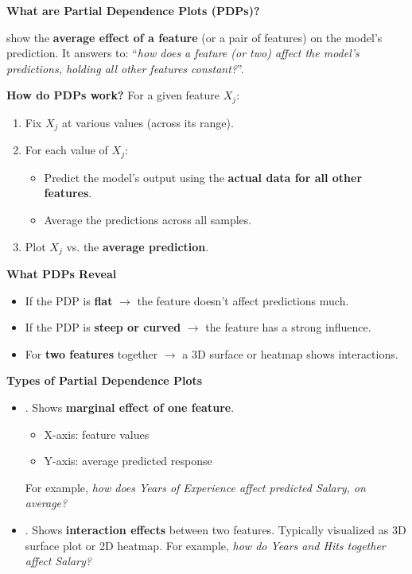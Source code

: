\newpage

\begin{flushleft}
    \textcolor{Green3}{ \textbf{What are Partial Dependence Plots (PDPs)?}}
\end{flushleft}
 show the \textbf{average effect of a feature} (or a pair of features) on the model's prediction. It answers to: ``\emph{how does a feature (or two) affect the model's predictions, holding all other features constant?}''.

\highspace
\textcolor{Green3}{ \textbf{How do PDPs work?}} For a given feature $X_j$:
\begin{enumerate}
    \item Fix $X_j$ at various values (across its range).
    \item For each value of $X_j$:
    \begin{itemize}
        \item Predict the model's output using the \textbf{actual data for all other features}.
        \item Average the predictions across all samples.
    \end{itemize}
    \item Plot $X_j$ vs. the \textbf{average prediction}.
\end{enumerate}

\highspace
\begin{flushleft}
    \textcolor{Green3}{ \textbf{What PDPs Reveal}}
\end{flushleft}
\begin{itemize}
    \item If the PDP is \textbf{flat} $\rightarrow$ the feature doesn't affect predictions much.
    \item If the PDP is \textbf{steep or curved} $\rightarrow$ the feature has a strong influence.
    \item For \textbf{two features} together $\rightarrow$ a 3D surface or heatmap shows interactions.
\end{itemize}

\highspace
\begin{flushleft}
    \textcolor{Green3}{ \textbf{Types of Partial Dependence Plots}}
\end{flushleft}
\begin{itemize}
    \item {}. Shows \textbf{marginal effect of one feature}.
    \begin{itemize}
        \item X-axis: feature values
        \item Y-axis: average predicted response
    \end{itemize}
    For example, \emph{how does Years of Experience affect predicted Salary, on average?}
    \item {}. Shows \textbf{interaction effects} between two features. Typically visualized as 3D surface plot or 2D heatmap. For example, \emph{how do Years and Hits together affect Salary?}
\end{itemize}

